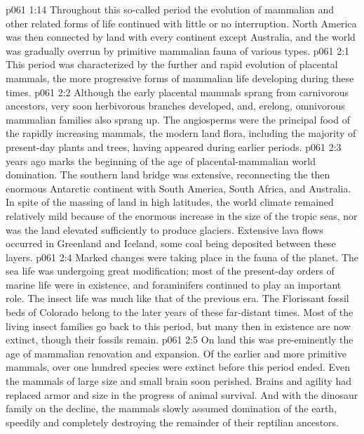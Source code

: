 \vs p061 1:14 \pc Throughout this so\hyp{}called  period the evolution of mammalian and other related forms of life continued with little or no interruption. North America was then connected by land with every continent except Australia, and the world was gradually overrun by primitive mammalian fauna of various types.
\vs p061 2:1 This period was characterized by the further and rapid evolution of placental mammals, the more progressive forms of mammalian life developing during these times.
\vs p061 2:2 Although the early placental mammals sprang from carnivorous ancestors, very soon herbivorous branches developed, and, erelong, omnivorous mammalian families also sprang up. The angiosperms were the principal food of the rapidly increasing mammals, the modern land flora, including the majority of present\hyp{}day plants and trees, having appeared during earlier periods.
\vs p061 2:3 \pc {} years ago marks the beginning of the age of placental\hyp{}mammalian world domination. The southern land bridge was extensive, reconnecting the then enormous Antarctic continent with South America, South Africa, and Australia. In spite of the massing of land in high latitudes, the world climate remained relatively mild because of the enormous increase in the size of the tropic seas, nor was the land elevated sufficiently to produce glaciers. Extensive lava flows occurred in Greenland and Iceland, some coal being deposited between these layers.
\vs p061 2:4 Marked changes were taking place in the fauna of the planet. The sea life was undergoing great modification; most of the present\hyp{}day orders of marine life were in existence, and foraminifers continued to play an important role. The insect life was much like that of the previous era. The Florissant fossil beds of Colorado belong to the later years of these far\hyp{}distant times. Most of the living insect families go back to this period, but many then in existence are now extinct, though their fossils remain.
\vs p061 2:5 On land this was pre\hyp{}eminently the age of mammalian renovation and expansion. Of the earlier and more primitive mammals, over one hundred species were extinct before this period ended. Even the mammals of large size and small brain soon perished. Brains and agility had replaced armor and size in the progress of animal survival. And with the dinosaur family on the decline, the mammals slowly assumed domination of the earth, speedily and completely destroying the remainder of their reptilian ancestors.

